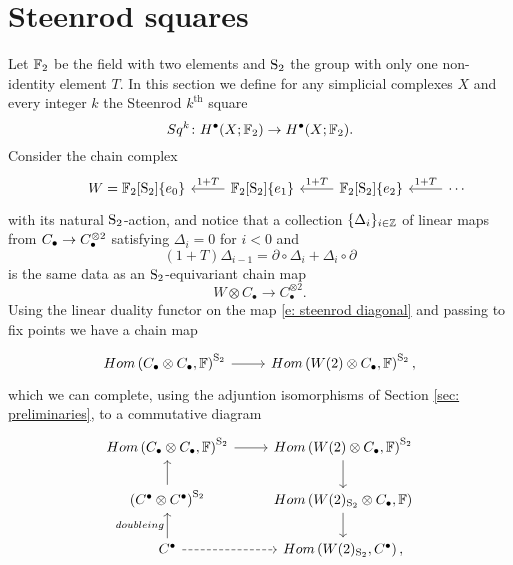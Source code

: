 
\section{Steenrod squares} \label{s:steenrod_squares}

Let $\F_2$ be the field with two elements and $\S_2$ the group with only one non-identity element $T$.
In this section we define for any simplicial complexes $X$ and every integer $k$ the Steenrod $k^{\mathrm{th}}$ square
\begin{equation*}
Sq^k \colon H^\bullet(X; \F_2) \to H^{\bullet}(X; \F_2).
\end{equation*}
Consider the chain complex
\begin{equation*}
\begin{tikzcd}[column sep=normal]
& W =  \F_2[\S_2]\{e_0\} & \arrow[l, "1+T"'] \F_2[\S_2]\{e_1\} & \arrow[l, "1+T"']
\F_2[\S_2]\{e_2\} & \arrow[l, "1+T"'] \cdots
\end{tikzcd}
\end{equation*}
with its natural $\S_2$-action, and notice that a collection $\{\Delta_i\}_{i\in \Z}$ of linear maps from $\chains \to \chains^{\otimes 2}$ satisfying $\Delta_i = 0$ for $i < 0$ and
\begin{equation*}
(1 + T) \Delta_{i-1} = \partial \circ \Delta_i + \Delta_i \circ \partial
\end{equation*}
is the same data as an $\S_2$-equivariant chain map
\begin{equation} \label{e: steenrod diagonal}
W \otimes C_\bullet \to C_\bullet^{\otimes 2}.
\end{equation}
Using the linear duality functor on the map \eqref{e: steenrod diagonal} and passing to fix points we have a chain map
\begin{equation*}
\begin{tikzcd}
Hom\left(C_\bullet \otimes C_\bullet, \F \right)^{\mathrm S_2} \arrow[r] &
Hom\left(W(2) \otimes C_\bullet, \F \right)^{\mathrm S_2},
\end{tikzcd}
\end{equation*}
which we can complete, using the adjuntion isomorphisms of Section \ref{sec: preliminaries}, to a commutative diagram
\begin{equation*}
\begin{tikzcd}
Hom\left(C_\bullet \otimes C_\bullet, \F \right)^{\mathrm S_2} \arrow[r] &
Hom\left(W(2) \otimes C_\bullet, \F \right)^{\mathrm S_2} \arrow[d] \\
\left(C^\bullet \otimes C^\bullet\right)^{\mathrm S_2} \arrow[u]&
Hom\left(W(2)_{\mathrm S_2} \otimes C_\bullet, \F \right) \arrow[d] \\
C^\bullet \arrow[u, "doubleing"] \arrow[r, dashed]&
Hom\left(W(2)_{\mathrm S_2}, C^\bullet\right),
\end{tikzcd}
\end{equation*}
